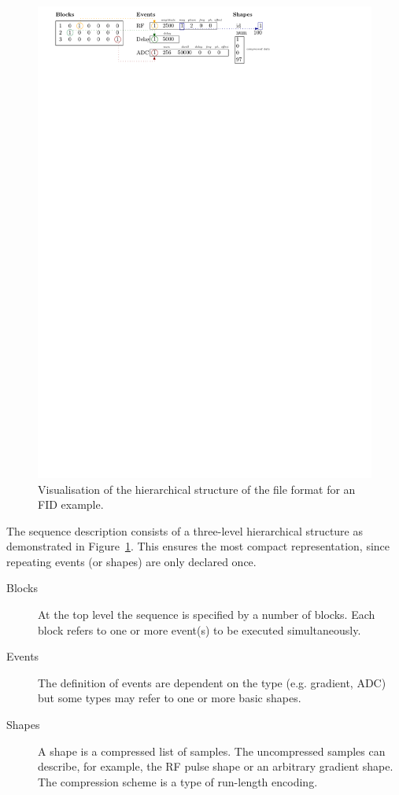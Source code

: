 \documentclass{article}
\begin{document}
\begin{figure}[H]
\includegraphics[width=\columnwidth]{block_diagram}
\caption{Visualisation of the hierarchical structure of the file format for an FID example.\label{fig:block_diagram}}
\end{figure}

The sequence description consists of a three-level hierarchical structure as demonstrated in Figure~\ref{fig:block_diagram}. This ensures the most compact representation, since repeating events (or shapes) are only declared once.
\begin{description}
\item[Blocks] At the top level the sequence is specified by a number of blocks. Each block refers to one or more event(s) to be executed simultaneously.
\item[Events] The definition of events are dependent on the type (e.g. gradient, ADC) but some types may refer to one or more basic shapes.
\item[Shapes] A shape is a compressed list of samples. The uncompressed samples can describe, for example, the RF pulse shape or an arbitrary gradient shape. The compression scheme is a type of run-length encoding.
\end{description}
\end{document}
